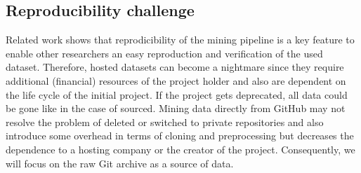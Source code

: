 \subsection{Reproducibility challenge}
Related work shows that reprodicibility of the mining pipeline is a key feature to enable other researchers an easy reproduction and verification of the used dataset. Therefore, hosted datasets can become a nightmare since they require additional (financial) resources of the project holder and also are dependent on the life cycle of the initial project. If the project gets deprecated, all data could be gone like in the case of sourced. Mining data directly from GitHub may not resolve the problem of deleted or switched to private repositories and also introduce some overhead in terms of cloning and preprocessing but decreases the dependence to a hosting company or the creator of the project. Consequently, we will focus on the raw Git archive as a source of data.

